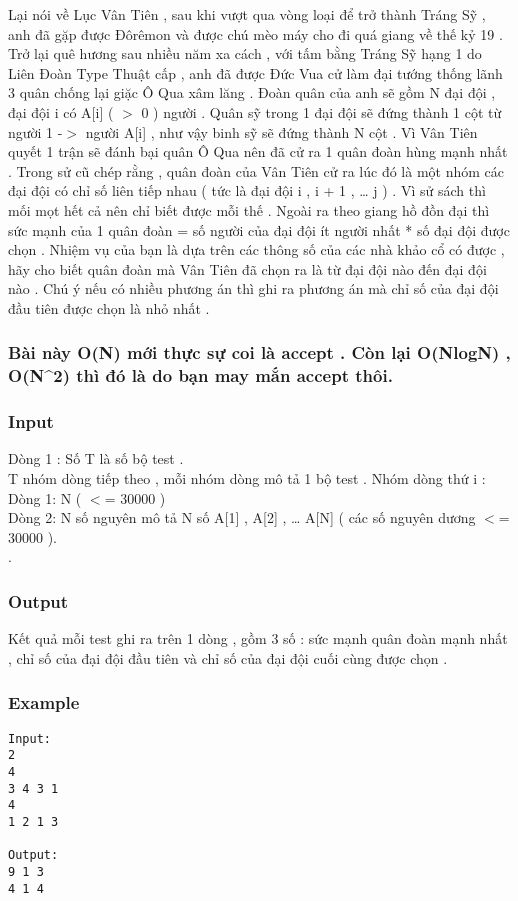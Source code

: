 



   Lại nói về Lục Vân Tiên , sau khi vượt qua vòng loại để trở thành Tráng Sỹ , anh đã gặp được Đôrêmon và được chú mèo máy cho đi quá giang về thế kỷ 19 . Trở lại quê hương sau nhiều năm xa cách , với tấm bằng Tráng Sỹ hạng 1 do Liên Đoàn Type Thuật cấp , anh đã được Đức Vua cử làm đại tướng thống lãnh 3 quân chống lại giặc Ô Qua xâm lăng . Đoàn quân của anh sẽ gồm N đại đội , đại đội i có A[i] ( $>$ 0 ) người . Quân sỹ trong 1 đại đội sẽ đứng thành 1 cột từ người 1 -$>$ người A[i] , như vậy binh sỹ sẽ đứng thành N cột . Vì Vân Tiên quyết 1 trận sẽ đánh bại quân Ô Qua nên đã cử ra 1 quân đoàn hùng mạnh nhất . Trong sử cũ chép rằng , quân đoàn của Vân Tiên cử ra lúc đó là một nhóm các đại đội có chỉ số liên tiếp nhau ( tức là đại đội i , i + 1 , … j ) . Vì sử sách thì mối mọt hết cả nên chỉ biết được mỗi thế . Ngoài ra theo giang hồ đồn đại thì sức mạnh của 1 quân đoàn = số người của đại đội ít người nhất * số đại đội được chọn . Nhiệm vụ của bạn là dựa trên các thông số của các nhà khảo cổ có được , hãy cho biết quân đoàn mà Vân Tiên đã chọn ra là từ đại đội nào đến đại đội nào . Chú ý nếu có nhiều phương án thì ghi ra phương án mà chỉ số của đại đội đầu tiên được chọn là nhỏ nhất .  

\subsubsection{   Bài này O(N) mới thực sự coi là accept . Còn lại O(NlogN) , O(N\textasciicircum2) thì đó là do bạn may mắn accept thôi.  }

\subsubsection{   Input  }

   Dòng 1 : Số T là số bộ test .   
\\   T nhóm dòng tiếp theo , mỗi nhóm dòng mô tả 1 bộ test . Nhóm dòng thứ i :   
\\   Dòng 1: N ( $<$= 30000 )   
\\   Dòng 2: N số nguyên mô tả N số A[1] , A[2] , … A[N] ( các số nguyên dương $<$= 30000 ).   
\\   .  

\subsubsection{   Output  }

   Kết quả mỗi test ghi ra trên 1 dòng , gồm 3 số : sức mạnh quân đoàn mạnh nhất , chỉ số của đại đội đầu tiên và chỉ số của đại đội cuối cùng được chọn .  

\subsubsection{   Example  }
\begin{verbatim}
Input:
2
4
3 4 3 1
4
1 2 1 3

Output:
9 1 3
4 1 4
\end{verbatim}
